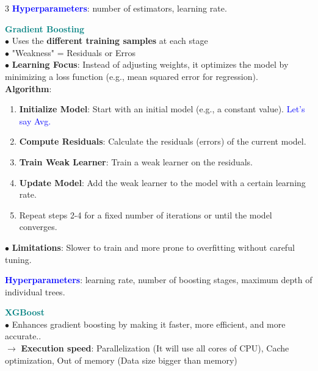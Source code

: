 \documentclass[letterpaper, 10.5pt,landscape]{article}
\begin{document}
\begin{multicols*}{3}
\textbf{\textcolor{blue}{Hyperparameters}}: number of estimators, learning rate.


\vspace{3pt}
\textcolor{teal}{\textbf{Gradient Boosting}} \\
$\bullet$ Uses the \textbf{different training samples} at each stage \\
$\bullet$ "Weakness" =  Residuals or Erros \\
$\bullet$ \textbf{Learning Focus}: Instead of adjusting weights, it optimizes the model by minimizing a loss function (e.g., mean squared error for regression).\\
\textbf{Algorithm}:
\vspace{-3pt}
\begin{enumerate}
    \item \textbf{Initialize Model}: Start with an initial model (e.g., a constant value). \textcolor{blue}{Let's say Avg.}
    \vspace{-3pt}
    \item \textbf{Compute Residuals}: Calculate the residuals (errors) of the current model.
    \vspace{-3pt}
    \item \textbf{Train Weak Learner}: Train a weak learner on the residuals.
    \vspace{-3pt}
    \item \textbf{Update Model}: Add the weak learner to the model with a certain learning rate.
    \vspace{-3pt}
    \item Repeat steps 2-4 for a fixed number of iterations or until the model converges.
\end{enumerate}
$\bullet$ \textbf{Limitations}: Slower to train and more prone to overfitting without careful tuning.

\textbf{\textcolor{blue}{Hyperparameters}}: learning rate, number of boosting stages, maximum depth of individual trees.




\vspace{3pt}
\textcolor{teal}{\textbf{XGBoost}} \\
$\bullet$ Enhances gradient boosting by making it faster, more efficient, and more accurate.. \\
$\rightarrow$ \textbf{Execution speed}: Parallelization (It will use all cores of CPU), Cache optimization, Out of memory (Data size bigger than memory) \\


\end{multicols*}
\end{document}
